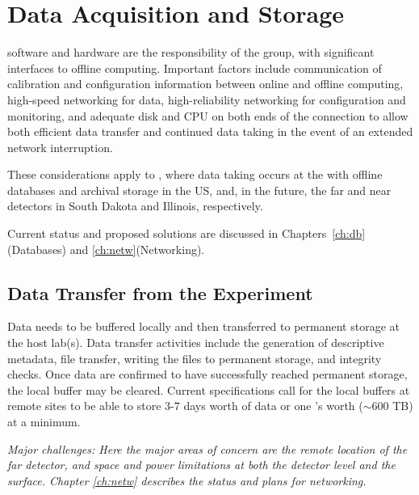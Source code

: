 \documentclass[../main-v1.tex]{subfiles}
\begin{document}





\section{Data Acquisition and Storage}

 software and hardware are the responsibility of the  group, with significant interfaces to offline computing. Important factors include communication of calibration and configuration information between online and offline computing, high-speed networking for data, high-reliability networking for configuration and monitoring, and adequate disk and CPU on both ends of the connection to allow both efficient data transfer and continued data taking in the event of an extended network interruption. 

These considerations apply to , where data taking occurs at the  with offline databases and archival storage in the US,  and, in the future, the far and near detectors in South Dakota and Illinois, respectively. 

Current status and proposed solutions are discussed in Chapters~\ref{ch:db}(Databases) and \ref{ch:netw}(Networking). 

\subsection{Data Transfer from the Experiment}
Data needs to be buffered locally and then transferred to permanent storage at the host lab(s).  Data transfer activities include the generation of descriptive metadata, file transfer, writing the files to permanent storage, and integrity checks.  Once data are confirmed to have successfully reached permanent storage, the local buffer may be cleared.  Current specifications call for the local buffers at remote sites to be able to store 3-7 days worth of data or one 's worth ($\sim 600$ TB) at a minimum. 

{\it Major challenges: Here the major areas of concern are the remote location of the far detector, and space and power limitations at both the  detector level and the surface. Chapter \ref{ch:netw} describes the status and plans for networking.} %
\end{document}
